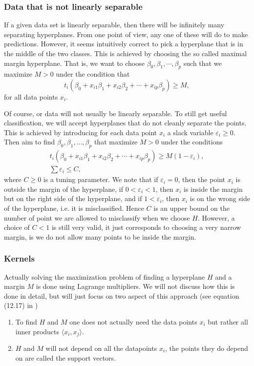 \documentclass[parskip=half]{scrartcl}
\theoremstyle{definition}
\theoremstyle{remark}
\begin{document}
\subsubsection{Data that is not linearly separable}

If a given data set is linearly separable, then there will be infinitely many separating hyperplanes. 
From one point of view, any one of these will do to make predictions. 
However, it seems intuitively correct to pick a hyperplane that is in the middle of the two classes. 
This is achieved by choosing the so called maximal margin hyperplane.
That is, we want to choose $\beta_0, \beta_1, \cdots, \beta_p$ such that we maximize $M > 0$ under the condition that 
\[
	t_i(\beta_0 + x_{i1} \beta_1 + x_{i2} \beta_2 + \cdots + x_{ip} \beta_p) \geq M,
\] 
for all data points $x_i$.

Of course, or data will not usually be linearly separable. 
To still get useful classification, we will accept hyperplanes that do not cleanly separate the points. 
This is achieved by introducing for each data point $x_i$ a slack variable $\varepsilon_i \geq 0$. 
Then aim to find $\beta_0, \beta_1, \ldots, \beta_p$ that maximize $M > 0$ under the conditions 
\begin{gather*}
	t_i(\beta_0 + x_{i1} \beta_1 + x_{i2} \beta_2 + \cdots + x_{ip} \beta_p) \geq M(1-\varepsilon_i), \\
	\sum \varepsilon_i \leq C,	
\end{gather*} 
where $C \geq 0$ is a tuning parameter.
We note that if $\varepsilon_i = 0$, then the point $x_i$ is outside the margin of the hyperplane, if $0 < \varepsilon_i < 1$, then $x_i$ is inside the margin but on the right side of the hyperplane, and if $1 < \varepsilon_i$, then $x_i$ is on the wrong side of the hyperplane, i.e. it is misclassified.  
Hence $C$ is an upper bound on the number of point we are allowed to misclassify when we choose $H$.
However, a choice of $C < 1$ is still very valid, it just corresponds to choosing a very narrow margin, is we do not allow many points to be inside the margin.    

\subsubsection{Kernels}

Actually solving the maximization problem of finding a hyperplane $H$ and a margin $M$ is done using Lagrange multipliers. 
We will not discuss how this is done in detail, but will just focus on two aspect of this approach (see equation (12.17) in \cite{htf:esl})
\begin{enumerate}
	\item To find $H$ and $M$ one does not actually need the data points $x_i$ but rather all inner products $\langle x_i, x_j \rangle$. 
	\item $H$ and $M$ will not depend on all the datapoints $x_i$, the points they do depend on are called the support vectors. 
\end{enumerate}
\end{document}
